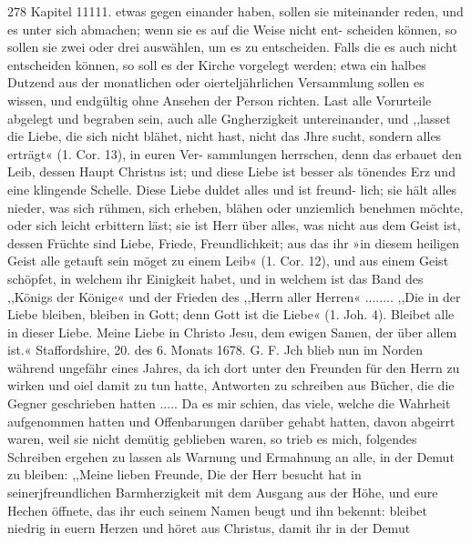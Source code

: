 278 Kapitel 11111.
etwas gegen einander haben, sollen sie miteinander reden, und
es unter sich abmachen; wenn sie es auf die Weise nicht ent-
scheiden können, so sollen sie zwei oder drei auswählen, um es
zu entscheiden. Falls die es auch nicht entscheiden können, so soll
es der Kirche vorgelegt werden; etwa ein halbes Dutzend aus der
monatlichen oder oierteljährlichen Versammlung sollen es wissen, und
endgültig ohne Ansehen der Person richten. Last alle Vorurteile
abgelegt und begraben sein, auch alle Gngherzigkeit untereinander,
und ,,lasset die Liebe, die sich nicht blähet, nicht hast, nicht das
Jhre sucht, sondern alles erträgt« (1. Cor. 13), in euren Ver-
sammlungen herrschen, denn das erbauet den Leib, dessen Haupt
Christus ist; und diese Liebe ist besser als tönendes Erz und
eine klingende Schelle. Diese Liebe duldet alles und ist freund-
lich; sie hält alles nieder, was sich rühmen, sich erheben,
blähen oder unziemlich benehmen möchte, oder sich leicht erbittern
läst; sie ist Herr über alles, was nicht aus dem Geist ist, dessen
Früchte sind Liebe, Friede, Freundlichkeit; aus das ihr »in diesem
heiligen Geist alle getauft sein möget zu einem Leib« (1. Cor. 12),
und aus einem Geist schöpfet, in welchem ihr Einigkeit habet,
und in welchem ist das Band des ,,Königs der Könige« und
der Frieden des ,,Herrn aller Herren« ........ ,,Die in
der Liebe bleiben, bleiben in Gott; denn Gott ist die Liebe«
(1. Joh. 4). Bleibet alle in dieser Liebe. Meine Liebe in Christo
Jesu, dem ewigen Samen, der über allem ist.«
Staffordshire, 20. des 6. Monats 1678. G. F.
Jch blieb nun im Norden während ungefähr eines Jahres,
da ich dort unter den Freunden für den Herrn zu wirken
und oiel damit zu tun hatte, Antworten zu schreiben aus Bücher,
die die Gegner geschrieben hatten ..... Da es mir schien, das
viele, welche die Wahrheit aufgenommen hatten und Offenbarungen
darüber gehabt hatten, davon abgeirrt waren, weil sie nicht
demütig geblieben waren, so trieb es mich, folgendes Schreiben
ergehen zu lassen als Warnung und Ermahnung an alle, in der
Demut zu bleiben:
,,Meine lieben Freunde,
Die der Herr besucht hat in seinerjfreundlichen Barmherzigkeit
mit dem Ausgang aus der Höhe, und eure Hechen öffnete, das
ihr euch seinem Namen beugt und ihn bekennt: bleibet niedrig in
euern Herzen und höret aus Christus, damit ihr in der Demut


